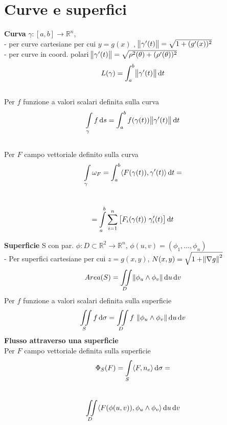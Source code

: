 \documentclass[a4paper,portrait,columns=3,5pt]{cheatsheet}
\begin{document}
\section{Curve e superfici}
\textbf{Curva} $\gamma:[a,b]\rightarrow\mathbb{R}^n$,\\
- per curve cartesiane per cui $y = g(x)$ , $\norm{\gamma'(t)} = \sqrt{1 + (g'(x))^2}$\\
- per curve in coord. polari $\norm{\gamma'(t)} = \sqrt{\rho^2(\theta) + (\rho'(\theta))^2} $\\
$$ L(\gamma) = \int_{a}^{b} \norm{\gamma'(t)} \dif t$$\\
Per $f$ funzione a valori scalari definita sulla curva
$$ \int\limits_{\gamma} f\dif s = \int_a^b f(\gamma(t)) \norm{\gamma'(t)} \dif t$$\\
Per $F$ campo vettoriale definito sulla curva
$$ \int\limits_\gamma \omega_{F} = \int_a^b \langle F(\gamma(t)), \gamma'(t)\rangle \dif t = $$\\
$$ = \int\limits_a^b \sum_{i=1}^n\left[F_i(\gamma(t))~\gamma_i'(t)\right] \dif t$$

\textbf{Superficie} S con par. $\phi:D\subset\mathbb{R}^2\rightarrow\mathbb{R}^n$, $\phi(u, v) = (\phi_1, \dots, \phi_n)$\\
- Per superfici cartesiane per cui $z = g(x,y)$, $N(x, y) = \sqrt{1 + \norm{\nabla g}^2}$
$$ Area(S) = \iint\limits_D \norm{\phi_u \wedge \phi_v} \dif u \dif v$$
Per $f$ funzione a valori scalari definita sulla superficie
$$ \iint\limits_S f \dif \sigma = \iint\limits_D f ~\norm{\phi_u \wedge \phi_v} \dif u \dif v $$
\textbf{Flusso attraverso una superficie}\\ Per $F$ campo vettoriale definita sulla superficie
$$ \Phi_S(F) = \int\limits_S \langle F, n_e \rangle \dif \sigma = $$ \\ 
$$ \iint\limits_D \langle F(\phi(u,v)), \phi_u \wedge \phi_v \rangle \dif u \dif v$$
\end{document}
